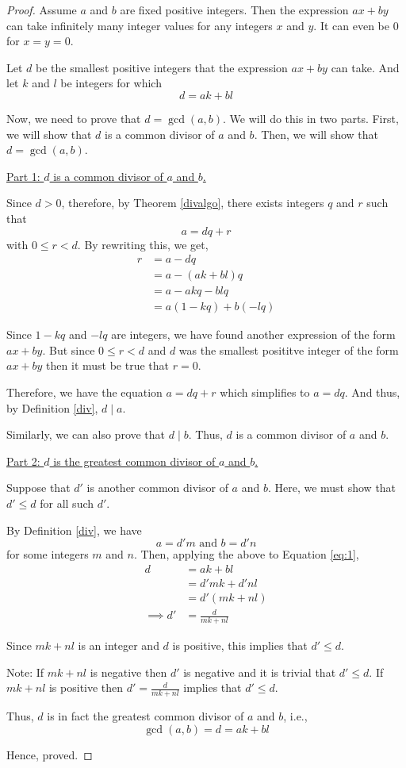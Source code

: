 \begin{proof}
	Assume $a$ and $b$ are fixed positive integers. Then the expression $ax+by$ can take infinitely many integer values for any integers $x$ and $y$. It can even be $0$ for $x = y = 0$. 

	Let $d$ be the smallest positive integers that the expression $ax+by$ can take. And let $k$ and $l$ be integers for which 
	\begin{equation} \label{eq:1}
		d = ak + bl
	\end{equation}

	Now, we need to prove that $d = \gcd(a,b)$. We will do this in two parts. First, we will show that $d$ is a common divisor of $a$ and $b$. Then, we will show that $d = \gcd(a,b)$.

	\underline{Part 1: $d$ is a common divisor of $a$ and $b$.}

	Since $d > 0$, therefore, by Theorem \ref{divalgo}, there exists integers $q$ and $r$ such that 
	$$a = dq + r$$
	with $0 \leq r < d$. By rewriting this, we get,
	\begin{align}
		r &= a - dq \\
			&= a - (ak+bl)q \\
			&= a - akq - blq \\
			&= a(1-kq) + b(-lq)
	\end{align}

	Since $1-kq$ and $-lq$ are integers, we have found another expression of the form $ax + by$. But since $0 \leq r < d$ and $d$ was the smallest posititve integer of the form $ax+by$ then it must be true that $r = 0$.

	Therefore, we have the equation $a = dq + r$ which simplifies to $a = dq$. And thus, by Definition \ref{div}, $d \mid a$.

	Similarly, we can also prove that $d \mid b$.
	Thus, $d$ is a common divisor of $a$ and $b$.

	\bigbreak

	\underline{Part 2: $d$ is the greatest common divisor of $a$ and $b$.}

	Suppose that $d'$ is another common divisor of $a$ and $b$. Here, we must show that $d' \leq d$ for all such $d'$.
	
	By Definition \ref{div}, we have $$a = d'm \text{ and } b = d'n$$
	for some integers $m$ and $n$. Then, applying the above to Equation \ref{eq:1}, 
	\begin{align}
		d &= ak + bl \\
			&= d'mk + d'nl \\
			&= d'(mk+nl) \\
		\implies d' &= \frac{d}{mk+nl}
	\end{align}

	Since $mk + nl$ is an integer and $d$ is positive, this implies that $d' \leq d$.

	Note: If $mk+nl$ is negative then $d'$ is negative and it is trivial that $d' \leq d$. If $mk+nl$ is positive then $d' = \frac{d}{mk+nl}$ implies that $d' \leq d$.

	Thus, $d$ is in fact the greatest common divisor of $a$ and $b$, i.e., $$\gcd(a, b) = d = ak + bl$$

	Hence, proved.
\end{proof}

